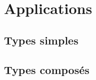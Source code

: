 \section{Applications}
\subsection{Types simples}
\setcounter{thequestion}{0}

\subsection{Types composés}
\setcounter{thequestion}{0}


